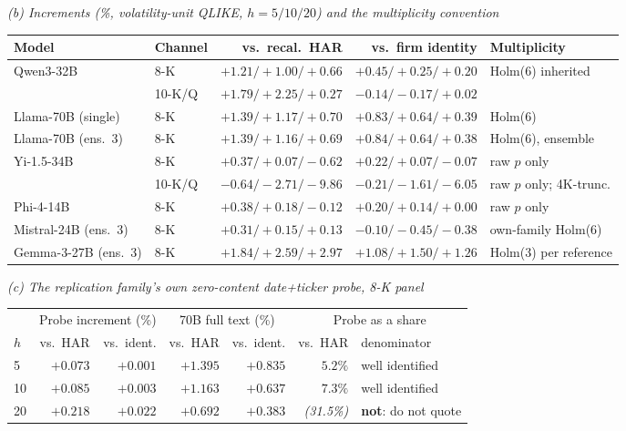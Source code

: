 \begin{table}[htbp]
\vspace{1.2ex}
\emph{(b) Increments (\%, volatility-unit QLIKE, $h = 5/10/20$) and the multiplicity convention}\\[0.4ex]
\begin{tabular}{@{}llrrl@{}}
\toprule
Model & Channel & vs.\ recal.\ HAR & vs.\ firm identity & Multiplicity \\
\midrule
Qwen3-32B           & 8-K    & $+1.21/+1.00/+0.66$ & $+0.45/+0.25/+0.20$ & Holm(6) inherited \\
                    & 10-K/Q & $+1.79/+2.25/+0.27$ & $-0.14/-0.17/+0.02$ & \\
Llama-70B (single)  & 8-K    & $+1.39/+1.17/+0.70$ & $+0.83/+0.64/+0.39$ & Holm(6) \\
Llama-70B (ens.\ 3) & 8-K    & $+1.39/+1.16/+0.69$ & $+0.84/+0.64/+0.38$ & Holm(6), ensemble \\
Yi-1.5-34B          & 8-K    & $+0.37/+0.07/-0.62$ & $+0.22/+0.07/-0.07$ & raw $p$ only \\
                    & 10-K/Q & $-0.64/-2.71/-9.86$ & $-0.21/-1.61/-6.05$ & raw $p$ only; 4K-trunc. \\
Phi-4-14B           & 8-K    & $+0.38/+0.18/-0.12$ & $+0.20/+0.14/+0.00$ & raw $p$ only \\
Mistral-24B (ens.\ 3) & 8-K  & $+0.31/+0.15/+0.13$ & $-0.10/-0.45/-0.38$ & own-family Holm(6) \\
Gemma-3-27B (ens.\ 3) & 8-K  & $+1.84/+2.59/+2.97$ & $+1.08/+1.50/+1.26$ & Holm(3) per reference \\
\bottomrule
\end{tabular}

\vspace{1.2ex}
\emph{(c) The replication family's own zero-content date{+}ticker probe, 8-K panel}\\[0.4ex]
\begin{tabular}{@{}lrrrrrl@{}}
\toprule
& \multicolumn{2}{c}{Probe increment (\%)} & \multicolumn{2}{c}{70B full text (\%)} & \multicolumn{2}{c}{Probe as a share} \\
\cmidrule(lr){2-3}\cmidrule(lr){4-5}\cmidrule(lr){6-7}
$h$ & vs.\ HAR & vs.\ ident. & vs.\ HAR & vs.\ ident. & vs.\ HAR & denominator \\
\midrule
5  & $+0.073$ & $+0.001$ & $+1.395$ & $+0.835$ & $5.2\%$    & well identified \\
10 & $+0.085$ & $+0.003$ & $+1.163$ & $+0.637$ & $7.3\%$    & well identified \\
20 & $+0.218$ & $+0.022$ & $+0.692$ & $+0.383$ & \emph{(31.5\%)} & \textbf{not}: do not quote \\
\bottomrule
\end{tabular}


\end{table}
